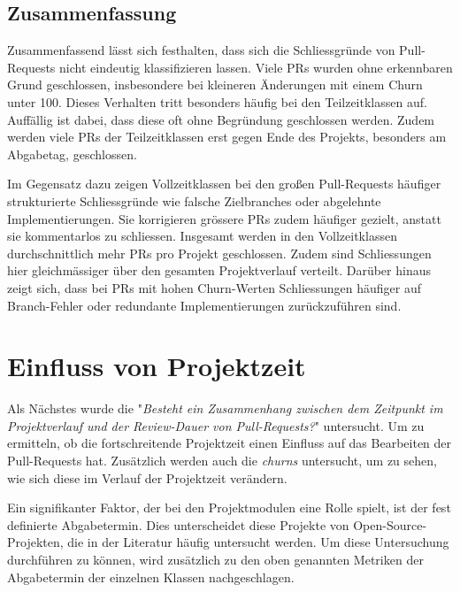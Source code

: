 \subsection{Zusammenfassung}

Zusammenfassend lässt sich festhalten, dass sich die Schliessgründe von Pull-Requests nicht eindeutig klassifizieren lassen. Viele PRs wurden ohne erkennbaren Grund geschlossen, insbesondere bei kleineren Änderungen mit einem Churn unter 100. Dieses Verhalten tritt besonders häufig bei den Teilzeitklassen auf. Auffällig ist dabei, dass diese oft ohne Begründung geschlossen werden. Zudem werden viele PRs der Teilzeitklassen erst gegen Ende des Projekts, besonders am Abgabetag, geschlossen.

Im Gegensatz dazu zeigen Vollzeitklassen bei den großen Pull-Requests häufiger strukturierte Schliessgründe wie falsche Zielbranches oder abgelehnte Implementierungen. Sie korrigieren grössere PRs zudem häufiger gezielt, anstatt sie kommentarlos zu schliessen. Insgesamt werden in den Vollzeitklassen durchschnittlich mehr PRs pro Projekt geschlossen. Zudem sind Schliessungen hier gleichmässiger über den gesamten Projektverlauf verteilt. Darüber hinaus zeigt sich, dass bei PRs mit hohen Churn-Werten Schliessungen häufiger auf Branch-Fehler oder redundante Implementierungen zurückzuführen sind.

\section{Einfluss von Projektzeit}
Als Nächstes wurde die  "\textit{Besteht ein Zusammenhang zwischen dem Zeitpunkt im Projektverlauf und der Review-Dauer von Pull-Requests?}" untersucht. Um zu ermitteln, ob die fortschreitende Projektzeit einen Einfluss auf das Bearbeiten der Pull-Requests hat. Zusätzlich werden auch die \textit{churns} untersucht, um zu sehen, wie sich diese im Verlauf der Projektzeit verändern. 


Ein signifikanter Faktor, der bei den Projektmodulen eine Rolle spielt, ist der fest definierte Abgabetermin. Dies unterscheidet diese Projekte von Open-Source-Projekten, die in der Literatur häufig untersucht werden. Um diese Untersuchung durchführen zu können, wird zusätzlich zu den oben genannten Metriken der Abgabetermin der einzelnen Klassen nachgeschlagen.

